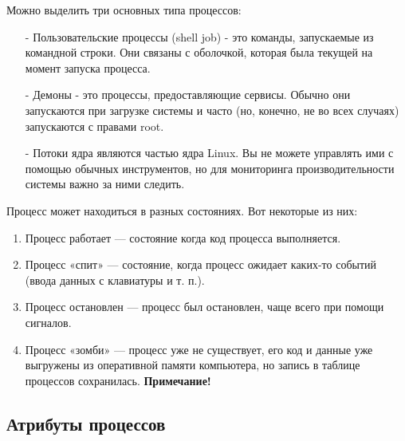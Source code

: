 \documentclass[14pt, a4paper]{article}
\begin{document}
\noindent Можно выделить три основных типа процессов:
\begin{itemize}
    \item[-] Пользовательские процессы (shell job) - это команды, запускаемые из командной строки. Они
    связаны с оболочкой, которая была текущей на момент запуска процесса.
    \item[-] Демоны - это процессы, предоставляющие сервисы. Обычно они запускаются при загрузке
    системы и часто (но, конечно, не во всех случаях) запускаются с правами root.
    \item[-] Потоки ядра являются частью ядра Linux. Вы не можете управлять ими с помощью обычных
    инструментов, но для мониторинга производительности системы важно за ними следить.
\end{itemize}

\noindent Процесс может находиться в разных состояниях. Вот некоторые из них:
\begin{enumerate}
    \item Процесс работает — состояние когда код процесса выполняется.
    \item Процесс «спит» — состояние, когда процесс ожидает каких-то событий (ввода данных с
    клавиатуры и т. п.).
    \item Процесс остановлен — процесс был остановлен, чаще всего при помощи сигналов.
    \item Процесс «зомби» — процесс уже не существует, его код и данные уже выгружены из
    оперативной памяти компьютера, но запись в таблице процессов сохранилась. \textbf{Примечание!}
     \\
\end{enumerate}

\subsection*{Атрибуты процессов} 
\end{document}
